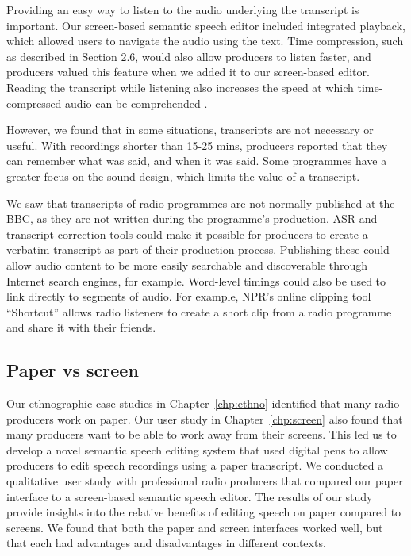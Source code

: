 
Providing an easy way to listen to the audio underlying the transcript is important. Our screen-based semantic speech
editor included integrated playback, which allowed users to navigate the audio using the text.  Time compression, such
as described in Section 2.6, would also allow producers to listen faster, and producers valued this feature when we
added it to our screen-based editor. Reading the transcript while listening also increases the
speed at which time-compressed audio can be comprehended \citep{Vemuri2004}.

However, we found that in some situations, transcripts are not necessary or useful. With recordings shorter than 15-25
mins, producers reported that they can remember what was said, and when it was said. Some programmes have a greater
focus on the sound design, which limits the value of a transcript.



We saw that transcripts of radio programmes are not normally published at the BBC, as they are not written during the
programme's production. ASR and transcript correction tools could make it possible for producers to create a verbatim
transcript as part of their production process.  Publishing these could allow audio content to be more easily
searchable and discoverable through Internet search engines, for example.  Word-level timings could also be used to
link directly to segments of audio. For example, NPR's online clipping tool ``Shortcut'' \citep{Friedhoff2016} allows
radio listeners to create a short clip from a radio programme and share it with their friends. 

\subsection{Paper vs screen}

Our ethnographic case studies in Chapter~\ref{chp:ethno} identified that many radio producers work on paper.
Our user study in Chapter~\ref{chp:screen} also found that many producers want to be able to work away from their
screens.  This led us to develop a novel semantic speech editing system that used digital pens to allow producers to
edit speech recordings using a paper transcript.  We conducted a qualitative user study with professional radio producers
that compared our paper interface to a screen-based semantic speech editor. The results of our study provide insights
into the relative benefits of editing speech on paper compared to screens. We found that both the paper and screen
interfaces worked well, but that each had advantages and disadvantages in different contexts.

